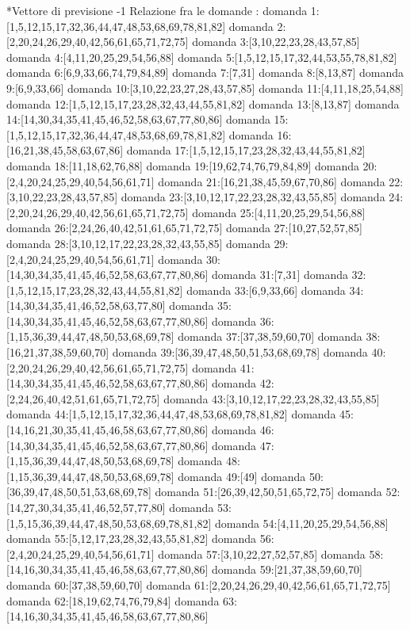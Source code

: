 *Vettore di previsione -1
Relazione fra le domande :
domanda 1:[1,5,12,15,17,32,36,44,47,48,53,68,69,78,81,82]
domanda 2:[2,20,24,26,29,40,42,56,61,65,71,72,75]
domanda 3:[3,10,22,23,28,43,57,85]
domanda 4:[4,11,20,25,29,54,56,88]
domanda 5:[1,5,12,15,17,32,44,53,55,78,81,82]
domanda 6:[6,9,33,66,74,79,84,89]
domanda 7:[7,31]
domanda 8:[8,13,87]
domanda 9:[6,9,33,66]
domanda 10:[3,10,22,23,27,28,43,57,85]
domanda 11:[4,11,18,25,54,88]
domanda 12:[1,5,12,15,17,23,28,32,43,44,55,81,82]
domanda 13:[8,13,87]
domanda 14:[14,30,34,35,41,45,46,52,58,63,67,77,80,86]
domanda 15:[1,5,12,15,17,32,36,44,47,48,53,68,69,78,81,82]
domanda 16:[16,21,38,45,58,63,67,86]
domanda 17:[1,5,12,15,17,23,28,32,43,44,55,81,82]
domanda 18:[11,18,62,76,88]
domanda 19:[19,62,74,76,79,84,89]
domanda 20:[2,4,20,24,25,29,40,54,56,61,71]
domanda 21:[16,21,38,45,59,67,70,86]
domanda 22:[3,10,22,23,28,43,57,85]
domanda 23:[3,10,12,17,22,23,28,32,43,55,85]
domanda 24:[2,20,24,26,29,40,42,56,61,65,71,72,75]
domanda 25:[4,11,20,25,29,54,56,88]
domanda 26:[2,24,26,40,42,51,61,65,71,72,75]
domanda 27:[10,27,52,57,85]
domanda 28:[3,10,12,17,22,23,28,32,43,55,85]
domanda 29:[2,4,20,24,25,29,40,54,56,61,71]
domanda 30:[14,30,34,35,41,45,46,52,58,63,67,77,80,86]
domanda 31:[7,31]
domanda 32:[1,5,12,15,17,23,28,32,43,44,55,81,82]
domanda 33:[6,9,33,66]
domanda 34:[14,30,34,35,41,46,52,58,63,77,80]
domanda 35:[14,30,34,35,41,45,46,52,58,63,67,77,80,86]
domanda 36:[1,15,36,39,44,47,48,50,53,68,69,78]
domanda 37:[37,38,59,60,70]
domanda 38:[16,21,37,38,59,60,70]
domanda 39:[36,39,47,48,50,51,53,68,69,78]
domanda 40:[2,20,24,26,29,40,42,56,61,65,71,72,75]
domanda 41:[14,30,34,35,41,45,46,52,58,63,67,77,80,86]
domanda 42:[2,24,26,40,42,51,61,65,71,72,75]
domanda 43:[3,10,12,17,22,23,28,32,43,55,85]
domanda 44:[1,5,12,15,17,32,36,44,47,48,53,68,69,78,81,82]
domanda 45:[14,16,21,30,35,41,45,46,58,63,67,77,80,86]
domanda 46:[14,30,34,35,41,45,46,52,58,63,67,77,80,86]
domanda 47:[1,15,36,39,44,47,48,50,53,68,69,78]
domanda 48:[1,15,36,39,44,47,48,50,53,68,69,78]
domanda 49:[49]
domanda 50:[36,39,47,48,50,51,53,68,69,78]
domanda 51:[26,39,42,50,51,65,72,75]
domanda 52:[14,27,30,34,35,41,46,52,57,77,80]
domanda 53:[1,5,15,36,39,44,47,48,50,53,68,69,78,81,82]
domanda 54:[4,11,20,25,29,54,56,88]
domanda 55:[5,12,17,23,28,32,43,55,81,82]
domanda 56:[2,4,20,24,25,29,40,54,56,61,71]
domanda 57:[3,10,22,27,52,57,85]
domanda 58:[14,16,30,34,35,41,45,46,58,63,67,77,80,86]
domanda 59:[21,37,38,59,60,70]
domanda 60:[37,38,59,60,70]
domanda 61:[2,20,24,26,29,40,42,56,61,65,71,72,75]
domanda 62:[18,19,62,74,76,79,84]
domanda 63:[14,16,30,34,35,41,45,46,58,63,67,77,80,86]
